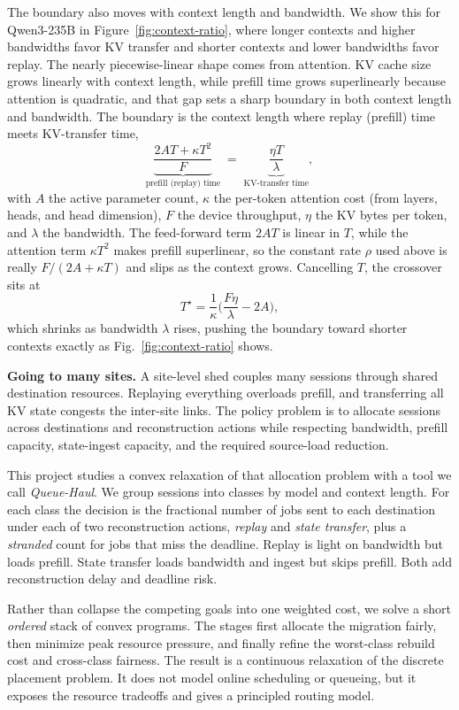 The boundary also moves with context length and bandwidth. We show this for Qwen3-235B in Figure~\ref{fig:context-ratio}, where longer contexts and higher bandwidths favor KV transfer and shorter contexts and lower bandwidths favor replay. The nearly piecewise-linear shape comes from attention. KV cache size grows linearly with context length, while prefill time grows superlinearly because attention is quadratic, and that gap sets a sharp boundary in both context length and bandwidth. The boundary is the context length where replay (prefill) time meets KV-transfer time,
\[
\underbrace{\frac{2AT+\kappa T^2}{F}}_{\text{prefill (replay) time}}\;=\;\underbrace{\frac{\eta T}{\lambda}}_{\text{KV-transfer time}},
\]
with $A$ the active parameter count, $\kappa$ the per-token attention cost (from layers, heads, and head dimension), $F$ the device throughput, $\eta$ the KV bytes per token, and $\lambda$ the bandwidth. The feed-forward term $2AT$ is linear in $T$, while the attention term $\kappa T^2$ makes prefill superlinear, so the constant rate $\rho$ used above is really $F/(2A+\kappa T)$ and slips as the context grows. Cancelling $T$, the crossover sits at
\[
T^\star=\frac{1}{\kappa}\Big(\frac{F\eta}{\lambda}-2A\Big),
\]
which shrinks as bandwidth $\lambda$ rises, pushing the boundary toward shorter contexts exactly as Fig.~\ref{fig:context-ratio} shows.


\textbf{Going to many sites.} A site-level shed couples many sessions through shared destination resources. Replaying everything overloads prefill, and transferring all KV state congests the inter-site links. The policy problem is to allocate sessions across destinations and reconstruction actions while respecting bandwidth, prefill capacity, state-ingest capacity, and the required source-load reduction.

This project studies a convex relaxation of that allocation problem with a tool we call \emph{Queue-Haul}. We group sessions into classes by model and context length. For each class the decision is the fractional number of jobs sent to each destination under each of two reconstruction actions, \emph{replay} and \emph{state transfer}, plus a \emph{stranded} count for jobs that miss the deadline. Replay is light on bandwidth but loads prefill. State transfer loads bandwidth and ingest but skips prefill. Both add reconstruction delay and deadline risk.

Rather than collapse the competing goals into one weighted cost, we solve a short \emph{ordered} stack of convex programs. The stages first allocate the migration fairly, then minimize peak resource pressure, and finally refine the worst-class rebuild cost and cross-class fairness. The result is a continuous relaxation of the discrete placement problem. It does not model online scheduling or queueing, but it exposes the resource tradeoffs and gives a principled routing model. 

